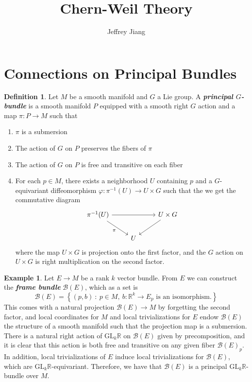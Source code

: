 \documentclass[psamsfonts, 12pt]{amsart}
\theoremstyle{definition}
\newtheorem{defn}[thm]{Definition}
\newtheorem{exmp}[thm]{Example}
\theoremstyle{remark}
\newcommand{\R}{\mathbb{R}}
\newcommand{\ib}[1]{\textbf{\textit{#1}}}
\newcommand{\GL}{\mathrm{GL}}
\newcommand{\inv}{^{-1}}
\newcommand{\set}[1]{\left\lbrace #1 \right\rbrace}
\begin{document}
%
\author{Jeffrey Jiang}
%
\title{Chern-Weil Theory}
%
\maketitle
%
\tableofcontents
%
\section{Connections on Principal Bundles}
%
\begin{defn}
Let $M$ be a smooth manifold and $G$ a Lie group. A \ib{principal $G$-bundle} is a
smooth manifold $P$ equipped with a smooth right $G$ action and a map $\pi : P \to M$ such
that
\begin{enumerate}
  \item $\pi$ is a submersion
  \item The action of $G$ on $P$ preserves the fibers of $\pi$
  \item The action of $G$ on $P$ is free and transitive on each fiber
  \item For each $p \in M$, there exists a neighborhood $U$ containing $p$
  and a $G$-equivariant diffeomorphism $\varphi : \pi\inv(U) \to U \times G$
  such that the we get the commutative diagram
  \[\begin{tikzcd}
  \pi\inv(U) \ar[dr, "\pi"']\ar[rr] && U \times G \ar[dl] \\
  & U
  \end{tikzcd}\]
  where the map $U \times G$ is projection onto the first factor, and the
  $G$ action on $U \times G$ is right multiplication on the second factor.
\end{enumerate}
\end{defn}
%
\begin{exmp}
Let $E \to M$ be a rank $k$ vector bundle. From $E$ we can construct the \ib{frame bundle}
$\mathcal{B}(E)$, which as a set is
\[
\mathcal{B}(E) = \set{(p,b) ~:~ p \in M,~ b : \R^k \to E_p \text{ is an isomorphism.}}
\]
This comes with a natural projection $\mathcal{B}(E) \to M$ by forgetting the
second factor, and local coordinates for $M$ and local trivializations for $E$ endow
$\mathcal{B}(E)$ the structure of a smooth manifold such that the projection
map is a submersion. There is a natural right action of $\GL_k\R$ on $\mathcal{B}(E)$
given by precomposition, and it is clear that this action is both free and transitive
on any given fiber $\mathcal{B}(E)_p$. In addition, local trivializations of $E$
induce local trivializations for $\mathcal{B}(E)$, which are $\GL_k\R$-equivariant.
Therefore, we have that $\mathcal{B}(E)$ is a principal $\GL_k\R$-bundle over
$M$.
\end{exmp}
\end{document}
